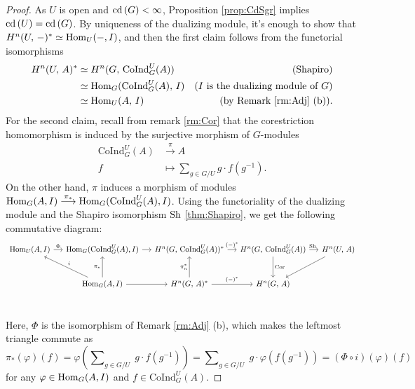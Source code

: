 \documentclass[a4paper, oneside]{memoir}
\begin{document}
\begin{proof}
	As \(U\) is open and \(\operatorname{cd}{(G)}<\infty\), Proposition \ref{prop:CdSgr} implies \(\operatorname{cd}{(U)}=\operatorname{cd}{(G)}\). By uniqueness of the dualizing module, it's enough to show that
	\(H^{n}( U, \, - )^*\simeq\operatorname{Hom}_U(-,I)\), and then the first claim follows from the functorial isomorphisms
	\begin{align*}
		H^{n}( U, \, A )^* & \simeq H^{n}( G, \, \mathrm{CoInd}_G^U(A) )   & \text{(Shapiro)}                            \\
		              & \simeq \operatorname{Hom}_G(\mathrm{CoInd}_G^U(A),\,I) & \text{($I$ is the dualizing module of $G$)} \\
		              & \simeq \operatorname{Hom}_U(A,\,I)                     & \text{(by Remark \eqref{rm:Adj} (b))}.
	\end{align*}
	For the second claim, recall from remark \ref{rm:Cor} that the corestriction homomorphism is induced by the surjective morphism of \(G\)-modules
	\begin{align*}
		\mathrm{CoInd}_G^U(A) & \overset{\pi}{\longrightarrow} A               \\
		f                     & \longmapsto \sum_{g\in G/U}{g\cdot f(g^{-1})}.
	\end{align*}
	On the other hand, $\pi$ induces a morphism of modules \(\operatorname{Hom}_G(A,I)\overset{\pi_*}{\longrightarrow}\operatorname{Hom}_G(\mathrm{CoInd}_G^U(A),I)\).
	Using the functoriality of the dualizing module and the Shapiro isomorphism $\operatorname{Sh}$ \eqref{thm:Shapiro},
	we get the following commutative diagram:
	\[
		\begin{tikzcd}[column sep=small, row sep=large]
			\Hom_U(A,I)
			\rar["\Phi"] &
			\Hom_G(\mathrm{CoInd}_G^U(A), I)
			\rar &
			\H{n}{G}{\mathrm{CoInd}_G^U(A)}^*
			\rar["(-)^*"]&\H{n}{G}{\mathrm{CoInd}_G^U(A)}
			\rar["\sh\ "]
			\ar[d, "\Cor"]&\H{n}{U}{A}\ar[dl] \\
			&
			\Hom_G(A,I) \ar[swap, lu, "i"]
			\ar[u, "\pi_*"]
			\rar &
			\H{n}{G}{A}^*
			\ar[u,"\pi_n^*"]
			\rar["(-)^*"] &
			\H{n}{G}{A} \\
		\end{tikzcd}
	\]
	Here, $\Phi$ is the isomorphism of Remark \ref{rm:Adj} (b),
	which makes the leftmost triangle commute as
	\[
		\pi_*(\varphi)(f) = \varphi\left(\sum\nolimits_{g\in G/U}\;{g\cdot f(g^{-1} )}\right) = \sum\nolimits_{g\in G/U}\;{g\cdot \varphi(f(g^{-1}))} = (\Phi\circ i) (\varphi)(f)
	\]
	for any \(\varphi\in\operatorname{Hom}_G(A,I)\) and \(f\in\mathrm{CoInd}_G^U(A)\).
\end{proof}
\end{document}
